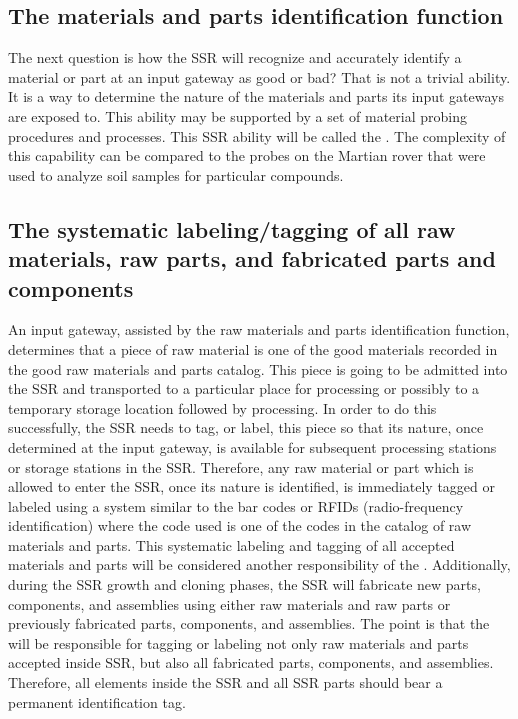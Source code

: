 \subsection[The materials and parts identification function]{The
materials and parts identification function}

The next question is how the SSR
will recognize and accurately identify a material or part at an input
gateway as good or bad? That is not a trivial ability. 
It is a way to
determine the nature of the materials and parts its input gateways are
exposed to. This ability may be supported by a set of material probing
procedures and processes. This SSR ability will be called the
. 
The complexity of this capability can be compared to the probes on the Martian rover that were used to analyze soil samples for particular compounds.

\subsection[The systematic labeling/tagging of all raw materials, raw parts, and fabricated parts and components]{The systematic labeling/tagging of all raw materials, raw parts, and fabricated parts
and components}

An input gateway,
assisted by the raw materials and parts identification function,
determines that a piece of raw material is one of the good materials
recorded in the good raw materials and parts catalog. This piece is
going to be admitted into the SSR and transported to a particular place
for processing or possibly to a temporary storage location followed by
processing.  In order to do this successfully, the SSR needs
to tag, or label, this piece so that its nature, once
determined at the input gateway, is available for
subsequent processing stations or storage stations in the SSR. Therefore,
any raw material or part which is allowed to enter the SSR, once
its nature is identified, is immediately tagged or labeled using a system
similar to the bar codes or RFIDs (radio-frequency identification)
where the code used is one of the codes in the catalog of raw materials
and parts. This systematic labeling and tagging of all accepted
materials and parts will be considered another responsibility of the
.  Additionally,
during the SSR growth and cloning phases, the SSR will fabricate new parts, components, and assemblies
using either raw materials and raw parts or previously fabricated
parts, components, and assemblies. The point is that the 
will be responsible for tagging or labeling not
only raw materials and parts accepted inside SSR, but also all
fabricated parts, components, and assemblies. Therefore,
all elements inside the SSR and all SSR parts should bear
a permanent identification tag.

